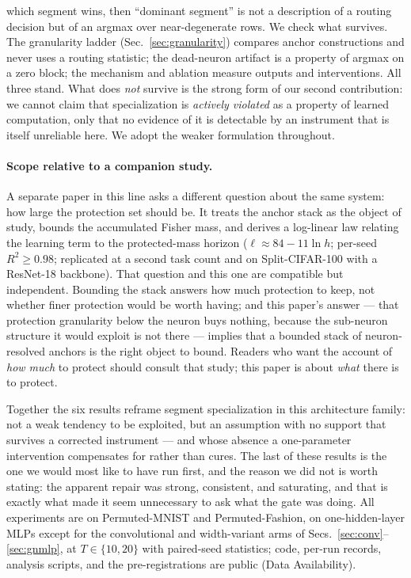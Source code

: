 \documentclass[10pt]{article}
\begin{document}
\begin{enumerate}
      which segment wins, then ``dominant segment'' is not a description
      of a routing decision but of an argmax over near-degenerate rows.
      We check what survives. The granularity ladder
      (Sec.~\ref{sec:granularity}) compares anchor constructions and never
      uses a routing statistic; the dead-neuron artifact is a property of
      argmax on a zero block; the mechanism and ablation measure outputs
      and interventions. All three stand. What does \emph{not} survive is
      the strong form of our second contribution: we cannot claim that
      specialization is \emph{actively violated} as a property of learned
      computation, only that no evidence of it is detectable by an
      instrument that is itself unreliable here. We adopt the weaker
      formulation throughout.
\end{enumerate}

\paragraph{Scope relative to a companion study.} A separate
paper in this line asks a different question about the same system: how
large the protection set should be. It treats the anchor stack as the
object of study, bounds the accumulated Fisher mass, and derives a
log-linear law relating the learning term to the protected-mass horizon
($\ell \approx 84 - 11\ln h$; per-seed $R^2 \ge 0.98$; replicated at a
second task count and on Split-CIFAR-100 with a ResNet-18 backbone).
That question and this one are compatible but independent. Bounding the
stack answers how much protection to keep, not whether finer protection
would be worth having; and this paper's answer --- that protection
granularity below the neuron buys nothing, because the sub-neuron
structure it would exploit is not there --- implies that a bounded stack
of neuron-resolved anchors is the right object to bound. Readers who
want the account of \emph{how much} to protect should consult that study;
this paper is about \emph{what} there is to protect.

Together the six results reframe segment specialization in this
architecture family: not a weak tendency to be exploited, but an
assumption with no support that survives a corrected instrument --- and
whose absence a one-parameter intervention compensates for rather than
cures. The last of these results is the one we would most like to have
run first, and the reason we did not is worth stating: the apparent
repair was strong, consistent, and saturating, and that is exactly what
made it seem unnecessary to ask what the gate was doing. All experiments are on
Permuted-MNIST and
Permuted-Fashion, on one-hidden-layer MLPs except for the convolutional and
width-variant arms of Secs.~\ref{sec:conv}--\ref{sec:gnmlp}, at $T\in\{10,20\}$
with paired-seed statistics; code,
per-run records, analysis scripts, and the pre-registrations are public
(Data Availability).
\end{document}

